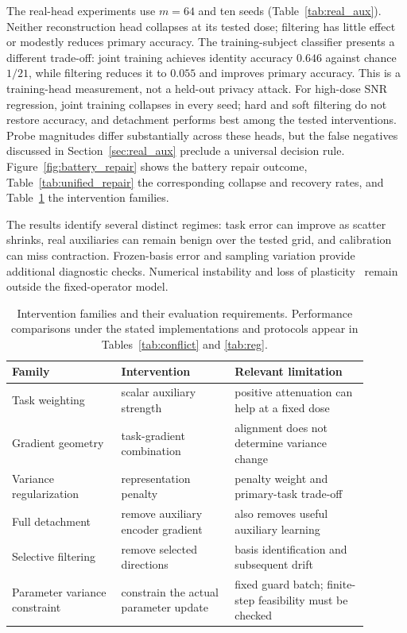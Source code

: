 \documentclass{article}
\begin{document}
The real-head experiments use $m=64$ and ten seeds (Table~\ref{tab:real_aux}). Neither reconstruction head collapses at its tested dose; filtering has little effect or modestly reduces primary accuracy. The training-subject classifier presents a different trade-off: joint training achieves identity accuracy $0.646$ against chance $1/21$, while filtering reduces it to $0.055$ and improves primary accuracy. This is a training-head measurement, not a held-out privacy attack. For high-dose SNR regression, joint training collapses in every seed; hard and soft filtering do not restore accuracy, and detachment performs best among the tested interventions. Probe magnitudes differ substantially across these heads, but the false negatives discussed in Section~\ref{sec:real_aux} preclude a universal decision rule. Figure~\ref{fig:battery_repair} shows the battery repair outcome, Table~\ref{tab:unified_repair} the corresponding collapse and recovery rates, and Table~\ref{tab:related} the intervention families.

The results identify several distinct regimes: task error can improve as scatter shrinks, real auxiliaries can remain benign over the tested grid, and calibration can miss contraction. Frozen-basis error and sampling variation provide additional diagnostic checks. Numerical instability and loss of plasticity~\citep{dohare2024loss} remain outside the fixed-operator model.

\begin{table}[t]
\centering
\caption{Intervention families and their evaluation requirements. Performance comparisons under the stated implementations and protocols appear in Tables~\ref{tab:conflict} and \ref{tab:reg}.}
\label{tab:related}
\footnotesize
\begin{tabular}{p{0.27\linewidth}p{0.29\linewidth}p{0.33\linewidth}}
\toprule
Family & Intervention & Relevant limitation \\
\midrule
Task weighting~\citep{chen2018gradnorm,liu2023famo} & scalar auxiliary strength & positive attenuation can help at a fixed dose \\
Gradient geometry~\citep{yu2020pcgrad,liu2021cagrad,navon2022multi} & task-gradient combination & alignment does not determine variance change \\
Variance regularization~\citep{bardes2022vicreg} & representation penalty & penalty weight and primary-task trade-off \\
Full detachment & remove auxiliary encoder gradient & also removes useful auxiliary learning \\
Selective filtering & remove selected directions & basis identification and subsequent drift \\
Parameter variance constraint & constrain the actual parameter update & fixed guard batch; finite-step feasibility must be checked \\
\bottomrule
\end{tabular}
\end{table}
\end{document}
